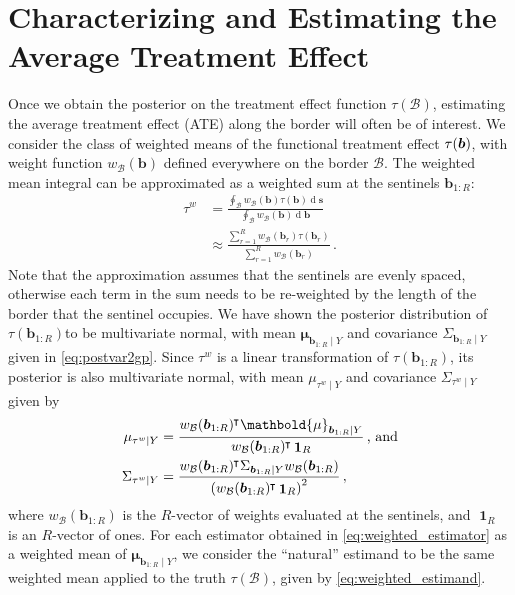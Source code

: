 \documentclass[letter,12pt]{article}
\DeclarePairedDelimiter{\parenthesis}{\lparen}{\rparen}
\newcommand{\del}[1]{\parenthesis*{#1}}
\DeclareMathOperator{\dif}{d}
\DeclareMathOperator{\ones}{\mathbf{1}}
\newcommand*{\trans}{^{\mkern-1.5mu\intercal}}
\newcommand{\svec}{\mathbold{s}}
\newcommand{\muvec}{\mathbold{\mu}}
\newcommand{\border}{\mathcal{B}}
\newcommand{\sentinel}{\bm{b}}
\newcommand{\numsent}{R}
\newcommand{\sentinels}{\sentinel_{1:\numsent}}
\newcommand{\isent}{r}
\newcommand{\tauw}{\tau^{w}}
\newcommand{\eqlabel}[1]{\label{#1}}
\newcommand{\weightb}{w_{\border}}
\begin{document}
\hypertarget{characterizing-and-estimating-the-average-treatment-effect}{%
\section{Characterizing and Estimating the Average Treatment Effect}\label{characterizing-and-estimating-the-average-treatment-effect}}



\label{sec:ate}



Once we obtain the posterior on the treatment effect function \(\tau(\border)\), estimating the average treatment effect (ATE) along the border will often be of interest.
We consider the class of weighted means of the functional treatment effect \(\tau\del{\sentinel}\),
with weight function \(\weightb(\sentinel)\) defined everywhere on the border \(\border\).
The weighted mean integral can be approximated as a weighted sum at the sentinels \(\sentinels\):
\begin{equation}\begin{split}
    \tauw &= \frac{\oint_\border \left. \weightb(\sentinel) \tau(\sentinel) \dif \svec \right.}
    {\oint_\border \left. \weightb(\sentinel) \dif \sentinel \right.}\\
    &\approx \frac{\sum_{\isent=1}^\numsent \weightb(\sentinel_\isent) \tau(\sentinel_\isent)}
    {\sum_{\isent=1}^\numsent \weightb(\sentinel_\isent) } \,.
\end{split}
\eqlabel{eq:weighted_estimand}
\end{equation}
Note that the approximation assumes that the sentinels are evenly spaced, otherwise each term in the sum needs to be re-weighted by the length of the border that the sentinel occupies.
We have shown the posterior distribution of \(\tau(\sentinels)\)to be multivariate normal, with mean \(\muvec_{\sentinels \mid Y}\) and covariance \(\Sigma_{\sentinels \mid Y}\) given in \eqref{eq:postvar2gp}.
Since \(\tauw\) is a linear transformation of \(\tau(\sentinels)\), its posterior is also multivariate normal, with mean \(\mu_{\tauw \mid Y}\) and covariance \(\Sigma_{\tauw \mid Y}\) given by
\begin{equation}\begin{split}
    \mu_{\tauw \mid Y} &= \frac{\weightb(\sentinels)\trans \muvec_{\sentinels \mid Y}}
    {\weightb(\sentinels)\trans  \ones_\numsent}\,\text{, and} \\
    \Sigma_{\tauw \mid Y} &= \frac{\weightb(\sentinels)\trans \Sigma_{\sentinels \mid Y} \weightb(\sentinels)}
    { \del{\weightb(\sentinels)\trans  \ones_\numsent }^2 } \,, \\
\end{split}
\eqlabel{eq:weighted_estimator}
\end{equation}
where \(\weightb(\sentinels)\) is the \(\numsent\)-vector of weights evaluated at the sentinels, and \(\ones_\numsent\) is an \(\numsent\)-vector of ones.
For each estimator obtained in \eqref{eq:weighted_estimator} as a weighted mean of \(\muvec_{\sentinels \mid Y}\), we consider the ``natural'' estimand to be the same weighted mean applied to the truth \(\tau(\border)\), given by \eqref{eq:weighted_estimand}.
\end{document}
